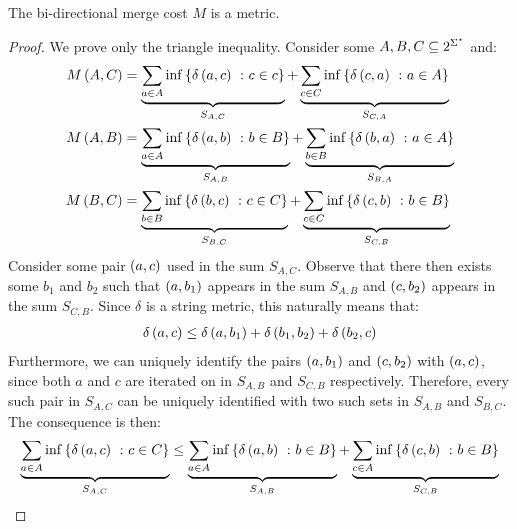 \documentclass[12pt]{article}
\begin{document}
\begin{theorem}
  The bi-directional merge cost \(M\) is a metric.
\end{theorem}
\begin{proof}
  We prove only the triangle inequality.
  Consider some \(A, B, C \subseteq 2^{\Sigma^\star}\) and:
  \begin{align*}
    M\left(A, C\right)
      &= \underbrace{
          \sum_{a \in A} \inf \left\{\delta\left(a, c\right) \ \colon c \in c\right\}
        }_{S_{A, C}} +
        \underbrace{
          \sum_{c \in C} \inf \left\{\delta\left(c, a\right) \ \colon a \in A\right\}
        }_{S_{C, A}} \\
    M\left(A, B\right)
      &=
        \underbrace{
          \sum_{a \in A} \inf \left\{\delta\left(a, b\right) \ \colon b \in B\right\}
        }_{S_{A, B}} +
        \underbrace{
          \sum_{b \in B} \inf \left\{\delta\left(b, a\right) \ \colon a \in A\right\}
        }_{S_{B, A}} \\
    M\left(B, C\right)
      &=
        \underbrace{
          \sum_{b \in B} \inf \left\{\delta\left(b, c\right) \ \colon c \in C\right\}
        }_{S_{B, C}} +
        \underbrace{
          \sum_{c \in C} \inf \left\{\delta\left(c, b\right) \ \colon b \in B\right\}
        }_{S_{C, B}}
  \end{align*}
  Consider some pair \(\left(a, c\right)\) used in the sum \(S_{A, C}\).
  Observe that there then exists some \(b_1\) and \(b_2\) such that
  \(\left(a, b_1\right)\) appears in the sum \(S_{A, B}\) and
  \(\left(c, b_2\right)\) appears in the sum \(S_{C, B}\).
  Since \(\delta\) is a string metric, this naturally means that:
  \begin{align*}
    \delta\left(a, c\right) \leq
      \delta\left(a, b_1\right) + \delta\left(b_1, b_2\right) + \delta\left(b_2, c\right)
  \end{align*}
  Furthermore, we can uniquely identify
  the pairs \(\left(a, b_1\right)\) and \(\left(c, b_2\right)\) with
  \(\left(a, c\right)\),
  since both \(a\) and \(c\) are iterated on in \(S_{A, B}\) and \(S_{C, B}\)
  respectively.
  Therefore, every such pair in \(S_{A, C}\) can be uniquely identified
  with two such sets in \(S_{A, B}\) and \(S_{B, C}\).
  The consequence is then:
  \begin{align*}
    \underbrace{
      \sum_{a \in A} \inf\left\{\delta\left(a, c\right) \ \colon c \in C\right\}
    }_{S_{A, C}}
      \leq
      \underbrace{
        \sum_{a \in A} \inf\left\{\delta\left(a, b\right) \ \colon b \in B\right\}
      }_{S_{A, B}} +
      \underbrace{
        \sum_{c \in A} \inf\left\{\delta\left(c, b\right) \ \colon b \in B\right\}
      }_{S_{C, B}}
  \end{align*}

\end{proof}
\end{document}
